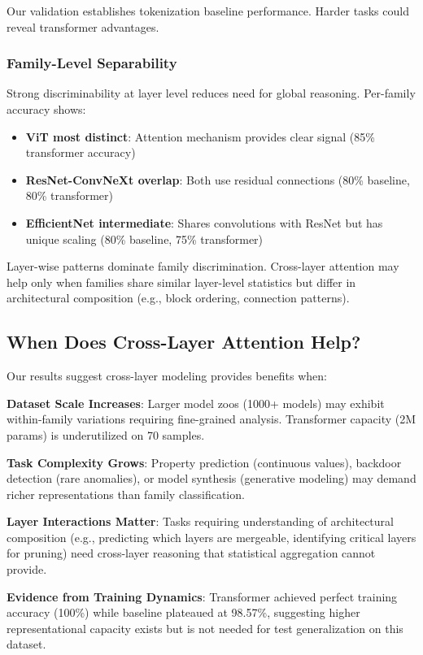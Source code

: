 Our validation establishes tokenization baseline performance. Harder tasks could reveal transformer advantages.

\subsubsection{Family-Level Separability}

Strong discriminability at layer level reduces need for global reasoning. Per-family accuracy shows:

\begin{itemize}
\item \textbf{ViT most distinct}: Attention mechanism provides clear signal (85\% transformer accuracy)
\item \textbf{ResNet-ConvNeXt overlap}: Both use residual connections (80\% baseline, 80\% transformer)
\item \textbf{EfficientNet intermediate}: Shares convolutions with ResNet but has unique scaling (80\% baseline, 75\% transformer)
\end{itemize}

Layer-wise patterns dominate family discrimination. Cross-layer attention may help only when families share similar layer-level statistics but differ in architectural composition (e.g., block ordering, connection patterns).

\subsection{When Does Cross-Layer Attention Help?}

Our results suggest cross-layer modeling provides benefits when:

\textbf{Dataset Scale Increases}: Larger model zoos (1000+ models) may exhibit within-family variations requiring fine-grained analysis. Transformer capacity (2M params) is underutilized on 70 samples.

\textbf{Task Complexity Grows}: Property prediction (continuous values), backdoor detection (rare anomalies), or model synthesis (generative modeling) may demand richer representations than family classification.

\textbf{Layer Interactions Matter}: Tasks requiring understanding of architectural composition (e.g., predicting which layers are mergeable, identifying critical layers for pruning) need cross-layer reasoning that statistical aggregation cannot provide.

\textbf{Evidence from Training Dynamics}: Transformer achieved perfect training accuracy (100\%) while baseline plateaued at 98.57\%, suggesting higher representational capacity exists but is not needed for test generalization on this dataset.

